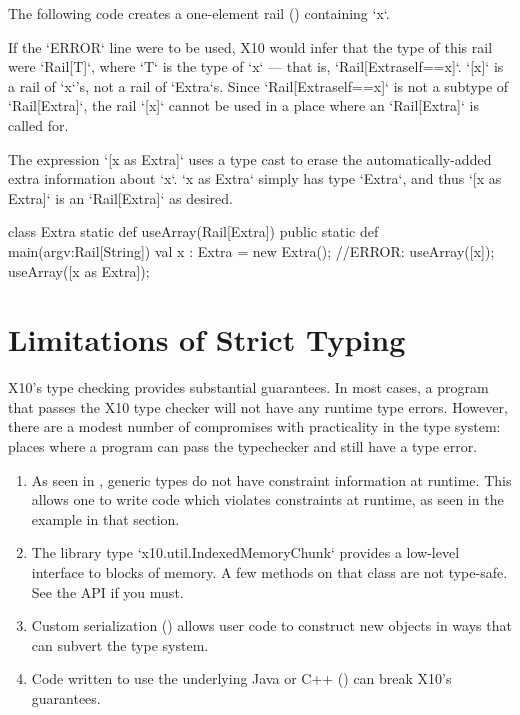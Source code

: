 \begin{ex}
The following code creates a one-element rail ()
containing \xcd`x`.  

If  the \xcd`ERROR` line were to be used, 
X10 would infer that the type of this rail were \xcd`Rail[T]`,
where \xcd`T` is the type of \xcd`x` --- that is, 
\xcd`Rail[Extra{self==x}]`.  \xcd`[x]` is a rail of \xcd`x`'s, not a rail
of \xcd`Extra`s.  Since \xcd`Rail[Extra{self==x}]` is not a subtype of 
\xcd`Rail[Extra]`, the rail \xcd`[x]` cannot be used in a place where an 
\xcd`Rail[Extra]` is called for.

The expression \xcd`[x as Extra]` uses a type cast to erase the
automatically-added extra information about \xcd`x`.  \xcd`x as Extra` simply
has type \xcd`Extra`, and thus \xcd`[x as Extra]` is an \xcd`Rail[Extra]` as
desired. 


\begin{xten}
class Extra {
  static def useArray(Rail[Extra]) {} 
  public static def main(argv:Rail[String]) {
     val x : Extra = new Extra();
     //ERROR: useArray([x]);
     useArray([x as Extra]);
  }
}
\end{xten}
%


\end{ex}

\section{Limitations of Strict Typing}
\label{sect:LimitationOfStrictTyping}

X10's type checking provides substantial guarantees.  In most cases, a program
that passes the X10 type checker will not have any runtime type errors.
However, there are a modest number of compromises with practicality in the
type system: places where a program can pass the typechecker and still have a
type error.

\begin{enumerate}

\item As seen in , generic types do not have
      constraint information at runtime.  This allows one to write code which
      violates constraints at runtime, as seen in the example in that section. 


\item The library type \xcd`x10.util.IndexedMemoryChunk` provides a low-level interface
      to blocks of memory.  A few methods on that class are not type-safe. See
      the API if you must.

\item Custom serialization () allows user code to
      construct new objects in ways that can subvert the type system.

\item Code written to use the underlying Java or C++ () can
      break X10's guarantees.

\end{enumerate}
